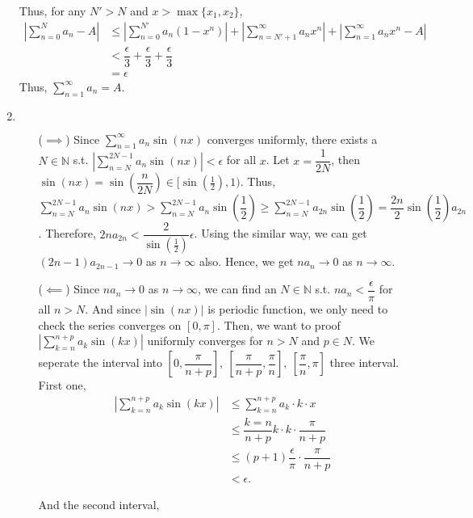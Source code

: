 \documentclass[12pt]{article}
\begin{document}
\begin{enumerate}
    Thus, for any $N' > N$ and $x > \max\{ x_1, x_2\}$,
    \begin{align*}
        |\sum_{n=0}^{N} a_n - A| &\leq |\sum_{n=0}^{N'} a_n(1-x^n)| + |\sum_{n=N'+1}^{\infty} a_n x^n | + |\sum_{n=1}^{\infty} a_nx^n - A|\\
        &< \dfrac{\epsilon}{3} + \dfrac{\epsilon}{3} + \dfrac{\epsilon}{3}\\
        &= \epsilon
    \end{align*}
    Thus, $\displaystyle\sum_{n=1}^{\infty} a_n = A$.

    \item $\ $\begin{enumerate}
        \item[($\implies$)] Since $\displaystyle\sum_{n=1}^{\infty} a_n \sin(nx)$ converges uniformly, 
        there exists a $N \in \mathbb{N}$ s.t. $|\displaystyle\sum_{n=N}^{2N-1} a_n \sin(nx)| < \epsilon$ for all $x$.
        Let $x = \dfrac{1}{2N}$, then $\sin(nx) = \sin(\dfrac{n}{2N})\in [\sin(\frac{1}{2}), 1)$.
        Thus, $\displaystyle\sum_{n=N}^{2N-1} a_n \sin(nx) > \displaystyle\sum_{n=N}^{2N-1} a_n \sin(\dfrac{1}{2}) \geq \displaystyle\sum_{n=N}^{2N-1} a_{2n} \sin(\dfrac{1}{2}) = \dfrac{2n}{2} \sin(\dfrac{1}{2})a_{2n}$.
        Therefore, $2n a_{2n} < \dfrac{2}{\sin(\frac{1}{2})}\epsilon$.
        Using the similar way, we can get $(2n-1) a_{2n-1}\to 0$ as $n\to\infty$ also.
        Hence, we get $na_n\to 0$ as $n\to\infty$.

        \item[($\impliedby$)] Since $na_n \to 0$ as $n\to \infty$, we can find an $N\in\mathbb{N}$ s.t.
        $na_n < \dfrac{\epsilon}{\pi}$ for all $n > N$.
        And since $|\sin(nx)|$ is periodic function, we only need to check the series converges on $[0, \pi]$.
        Then, we want to proof $|\displaystyle\sum_{k=n}^{n+p} a_k \sin(kx)|$ uniformly converges for $n > N$ and $p\in N$.
        We seperate the interval into $[0, \dfrac{\pi}{n+p}],\ [\dfrac{\pi}{n+p}, \dfrac{\pi}{n}],\ [\dfrac{\pi}{n}, \pi]$ three interval.
        First one, \begin{align*}
            |\sum_{k=n}^{n+p} a_k \sin(kx)| &\leq \sum_{k=n}^{n+p} a_k \cdot k \cdot x\\
            &\leq \dfrac{k=n}{n+p} k\cdot k \cdot \dfrac{\pi}{n+p}\\
            &\leq (p+1) \dfrac{\epsilon}{\pi}\cdot \dfrac{\pi}{n+p}\\
            & < \epsilon.
        \end{align*}

        And the second interval, 
        
    \end{enumerate}
\end{enumerate}
\end{document}

